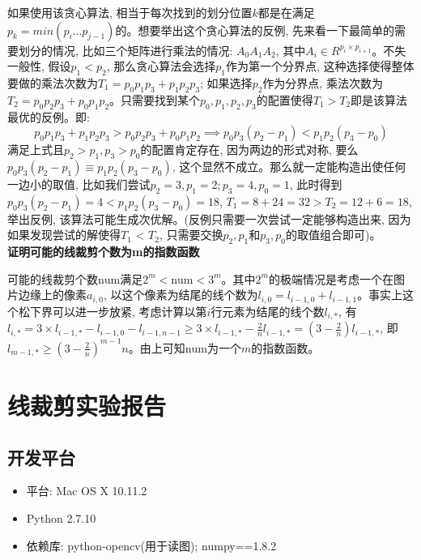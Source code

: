 \documentclass[paper=a4, fontsize=11pt]{scrartcl} %
\numberwithin{equation}{section} %
\numberwithin{figure}{section} %
\numberwithin{table}{section} %
\begin{document}
如果使用该贪心算法, 相当于每次找到的划分位置$k$都是在满足$p_k = min(p_i ... p_{j-1})$的。想要举出这个贪心算法的反例, 先来看一下最简单的需要划分的情况, 比如三个矩阵进行乘法的情况: $A_0A_1A_2$, 其中$A_i \in R^{p_i \times p_{i+1}}$。不失一般性, 假设$p_1 < p_2$, 那么贪心算法会选择$p_1$作为第一个分界点, 这种选择使得整体要做的乘法次数为$T_1 = p_0p_1p_3 + p_1p_2p_3$; 如果选择$p_2$作为分界点, 乘法次数为$T_2 = p_0p_2p_3 + p_0p_1p_2$。只需要找到某个$p_0, p_1, p_2, p_3$的配置使得$T_1 > T_2$即是该算法最优的反例。即:
\[
p_0p_1p_3 + p_1p_2p_3 > p_0p_2p_3 + p_0p_1p_2 \implies p_0p_3(p_2-p_1) < p_1p_2(p_3-p_0)
\]
满足上式且$p_2 > p_1, p_3 > p_0$的配置肯定存在, 因为两边的形式对称, 要么$p_0p_3(p_2 - p_1) \equiv p_1p_2(p_3-p_0)$, 这个显然不成立。那么就一定能构造出使任何一边小的取值, 比如我们尝试$p_2 = 3, p_1 = 2; p_3 = 4, p_0 = 1$, 此时得到$p_0p_3(p_2-p_1) = 4 < p_1p_2(p_3-p_0)=18$, $T_1 = 8 + 24 = 32 > T_2 = 12 + 6 = 18$, 举出反例, 该算法可能生成次优解。(反例只需要一次尝试一定能够构造出来, 因为如果发现尝试的解使得$T_1$ < $T_2$, 只需要交换$p_2, p_1$和$p_3, p_0$的取值组合即可)。
\\[4ex]

\textbf{证明可能的线裁剪个数为m的指数函数}

可能的线裁剪个数$\mbox{num}$满足$2^m < \mbox{num} < 3^m$。其中$2^m$的极端情况是考虑一个在图片边缘上的像素$a_{i, 0}$, 以这个像素为结尾的线个数为$l_{i, 0} = l_{i-1, 0} + l_{i-1, 1}$。事实上这个松下界可以进一步放紧, 考虑计算以第$i$行元素为结尾的线个数$l_{i, *}$, 有$l_{i, *} = 3 \times l_{i-1,*} - l_{i-1,0} - l_{i-1,n-1} \geq 3 \times l_{i-1,*} - \frac{2}{n}l_{i-1,*} = (3-\frac{2}{n})l_{i-1,*}$, 即$l_{m-1, *}\geq (3-\frac{2}{n})^{m-1}n$。由上可知$\mbox{num}$为一个$m$的指数函数。

\section {线裁剪实验报告}

\subsection{开发平台}

\begin{itemize}
\item 平台: Mac OS X 10.11.2
\item Python 2.7.10
\item 依赖库: python-opencv(用于读图); numpy==1.8.2
\end{itemize}
\end{document}
